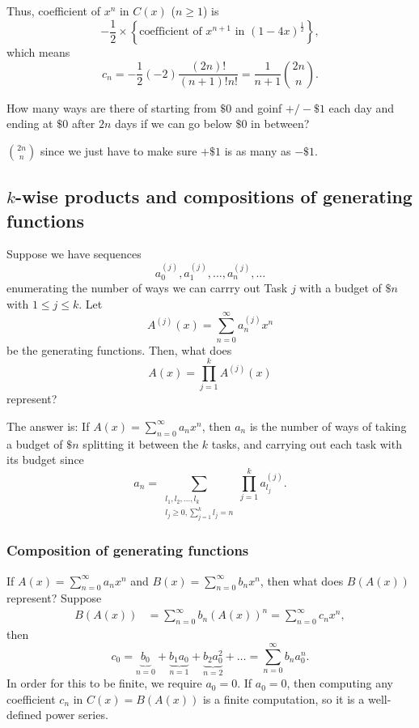 Thus, coefficient of \(x^n\) in \(C(x)\) (\(n \ge 1\)) is 
\[
    -\frac{1}{2} \times \left\{ \text{coefficient of } x^{n+1} \text{ in } (1 - 4x)^{\frac{1}{2}}   \right\}, 
\] which means 
\[
    c_n = -\frac{1}{2} (-2) \frac{(2n)!}{(n+1)!n!} = \frac{1}{n+1} \binom{2n}{n}.
\]


\begin{question}
    How many ways are there of starting from \(\$ 0\) and goinf \(+ / - \$ 1\) each day and ending at \(\$ 0\) after \(2n\) days if we can go below \(\$ 0\) in between?    
\end{question}
\begin{answer}
    \(\binom{2n}{n}\) since we just have to make sure \(+\$ 1\) is as many as \(-\$ 1\).   
\end{answer}

\subsection{\(k\)-wise products and compositions of generating functions}
Suppose we have sequences 
\[
    a_0^{(j)}, a_1^{(j)}, \dots , a_n^{(j)}, \dots 
\] enumerating the number of ways we can carrry out Task \(j\) with a budget of \(\$ n\) with \(1 \le j \le k\). Let 
\[
    A^{(j)}(x) = \sum_{n=0}^{\infty} a_n^{(j)} x^n 
\] be the generating functions. Then, what does 
\[
    A(x) = \prod _{j=1}^k A^{(j)}(x)
\] represent?

The answer is: If \(A(x) = \sum_{n=0}^{\infty} a_n x^n  \), then \(a_n\) is the number of ways of taking a budget of \(\$ n\) splitting it between the \(k\) tasks, and carrying out each task with its budget since 
\[
    a_n = \sum_{\substack{l_1, l_2, \dots , l_k \\ l_j \ge 0, \sum_{j=1}^k l_j = n }} \prod _{j=1}^k a_{l_j}^{(j)}. 
\]    

\subsubsection{Composition of generating functions}
If \(A(x) = \sum_{n=0}^{\infty} a_n x^n \) and \(B(x) = \sum_{n=0}^{\infty} b_n x^n \), then what does \(B(A(x))\) represent?
Suppose
\begin{align*}
    B(A(x)) &= \sum_{n=0}^{\infty} b_n \left( A(x) \right)^n = \sum_{n=0}^{\infty} c_n x^n,   
\end{align*}   
then 
\[
    c_0 = \underbrace{b_0}_{n=0} + \underbrace{b_1 a_0}_{n=1} + \underbrace{b_2 a_0^2}_{n=2} + \dots = \sum_{n=0}^{\infty} b_n a_0^n. 
\]
In order for this to be finite, we require \(a_0 = 0\). If \(a_0 = 0\), then computing any coefficient \(c_n\) in \(C(x) = B(A(x))\) is a finite computation, so it is a well-defined power series.

